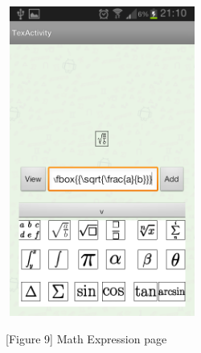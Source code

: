 \documentclass[29pt,a4paper]{moderncv}
\begin{document}
				\noindent\begin{figure}
								\centering
								\includegraphics[width=2.5in, height=4.0in]{./Screenshot_2013-10-23-21-10-16.png} \\
								\centering \caption{[Figure 9] Math Expression page}
								\end{figure}\\
					
				\vspace{4mm}
		
\end{document}
